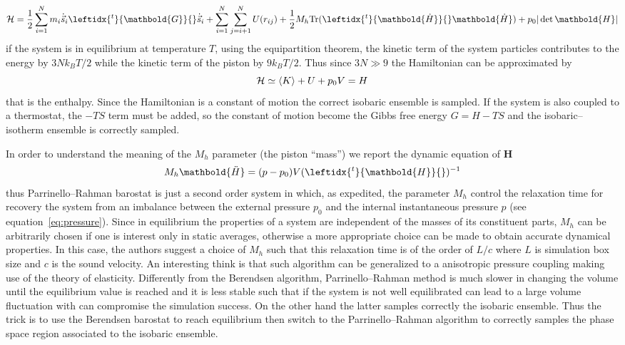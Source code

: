 \begin{equation*}
	\mathcal{H} = \frac{1}{2}\sum_{i=1}^N m_i \dot{\vec s}_i \leftidx{^t}{\mathbold{G}}{} \dot{\vec s}_i + \sum_{i=1}^N \sum_{j=i+1}^N U(r_{ij}) +  \frac{1}{2} M_h \text{Tr}( \leftidx{^t}{\mathbold{\dot H}}{} \mathbold{\dot H} ) +  p_0 |\det\mathbold{H}|
\end{equation*}
if the system is in equilibrium at temperature $T$, using the equipartition theorem, the kinetic term of the system particles contributes to the energy by $3Nk_BT/2$ while the kinetic term of the piston by $9k_BT/2$. Thus since $3N \gg 9$ the Hamiltonian can be approximated by
\begin{equation*}
	\mathcal{H} \simeq \left \langle K \right \rangle + U + p_0 V = H
\end{equation*}
that is the enthalpy. Since the Hamiltonian is a constant of motion the correct isobaric ensemble is sampled. If the system is also coupled to a thermostat, the $-TS$ term must be added, so the constant of motion become the Gibbs free energy $G = H - TS$ and the isobaric--isotherm ensemble is correctly sampled.

In order to understand the meaning of the $M_h$ parameter (the piston ``mass'') we report the dynamic equation of $\mathbold H$
\begin{equation*}
	M_h \mathbold{\ddot H} =  (p - p_0) V (\leftidx{^t}{\mathbold{H}}{})^{-1}
\end{equation*}
thus Parrinello--Rahman barostat is just a second order system in which, as expedited, the parameter $M_h$ control the relaxation time for recovery the system from an imbalance between the external pressure $p_0$ and the internal instantaneous pressure $p$ (see equation~\eqref{eq:pressure}). Since in equilibrium the properties of a system are independent of the masses of its constituent parts, $M_h$ can be arbitrarily chosen if one is interest only in static averages, otherwise a more appropriate choice can be made to obtain accurate dynamical properties. In this case, the authors suggest a choice of $M_h$ such that this relaxation time is of the order of $L/c$ where $L$ is simulation box size and $c$ is the sound velocity. An interesting think is that such algorithm can be generalized to a anisotropic pressure coupling making use of the theory of elasticity. Differently from the Berendsen algorithm, Parrinello--Rahman method is much slower in changing the volume until the equilibrium value is reached and it is less stable such that if the system is not well equilibrated can lead to a large volume fluctuation with can compromise the simulation success. On the other hand the latter samples correctly the isobaric ensemble. Thus the trick is to use the Berendsen barostat to reach equilibrium then switch to the Parrinello--Rahman algorithm to correctly samples the phase space region associated to the isobaric ensemble. 

